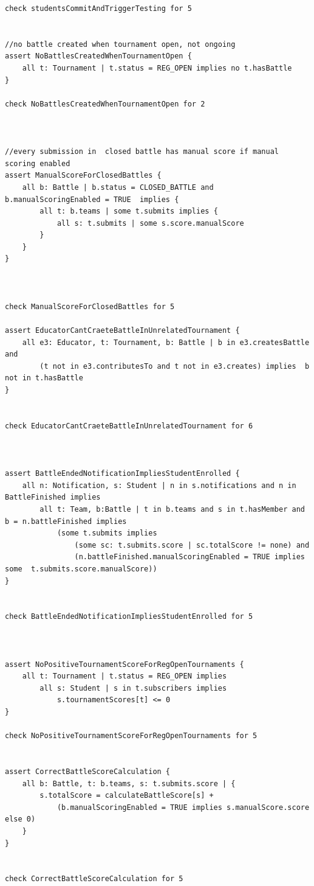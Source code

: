 \begin{lstlisting}[language=alloy]
check studentsCommitAndTriggerTesting for 5


//no battle created when tournament open, not ongoing
assert NoBattlesCreatedWhenTournamentOpen {
    all t: Tournament | t.status = REG_OPEN implies no t.hasBattle
}

check NoBattlesCreatedWhenTournamentOpen for 2



//every submission in  closed battle has manual score if manual scoring enabled
assert ManualScoreForClosedBattles {
    all b: Battle | b.status = CLOSED_BATTLE and b.manualScoringEnabled = TRUE  implies {
        all t: b.teams | some t.submits implies {
            all s: t.submits | some s.score.manualScore
        }
    }
}



check ManualScoreForClosedBattles for 5

assert EducatorCantCraeteBattleInUnrelatedTournament {
    all e3: Educator, t: Tournament, b: Battle | b in e3.createsBattle	and
        (t not in e3.contributesTo and t not in e3.creates) implies  b not in t.hasBattle
}


check EducatorCantCraeteBattleInUnrelatedTournament for 6



assert BattleEndedNotificationImpliesStudentEnrolled {
    all n: Notification, s: Student | n in s.notifications and n in BattleFinished implies
        all t: Team, b:Battle | t in b.teams and s in t.hasMember and b = n.battleFinished implies
            (some t.submits implies 
                (some sc: t.submits.score | sc.totalScore != none) and 
                (n.battleFinished.manualScoringEnabled = TRUE implies some  t.submits.score.manualScore))
}


check BattleEndedNotificationImpliesStudentEnrolled for 5



assert NoPositiveTournamentScoreForRegOpenTournaments {
    all t: Tournament | t.status = REG_OPEN implies
        all s: Student | s in t.subscribers implies
            s.tournamentScores[t] <= 0
}

check NoPositiveTournamentScoreForRegOpenTournaments for 5


assert CorrectBattleScoreCalculation {
    all b: Battle, t: b.teams, s: t.submits.score | {
        s.totalScore = calculateBattleScore[s] +
            (b.manualScoringEnabled = TRUE implies s.manualScore.score else 0)
    }
}


check CorrectBattleScoreCalculation for 5




\end{lstlisting}
